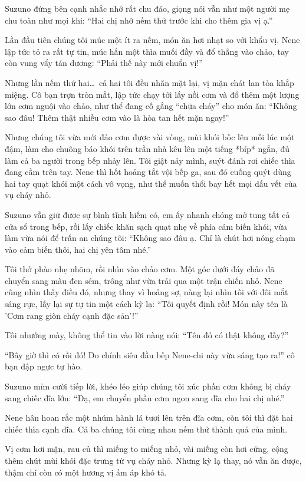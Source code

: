 \documentclass[../main.tex]{subfiles}
\begin{document}
Suzuno đứng bên cạnh nhắc nhở rất chu đáo, giọng nói vẫn như một người mẹ chu toàn như mọi khi: ``Hai chị nhớ nếm thử trước khi cho thêm gia vị ạ.''

Lần đầu tiên chúng tôi múc một ít ra nếm, món ăn hơi nhạt so với khẩu vị. Nene lập tức tỏ ra rất tự tin, múc hẳn một thìa muối đầy và đổ thẳng vào chảo, tay còn vung vẩy tán dương: ``Phải thế này mới chuẩn vị!''

Nhưng lần nếm thứ hai\dots\ cả hai tôi đều nhăn mặt lại, vị mặn chát lan tỏa khắp miệng. Cô bạn trợn tròn mắt, lập tức chạy tới lấy nồi cơm và đổ thêm một lượng lớn cơm nguội vào chảo, như thể đang cố gắng ``chữa cháy'' cho món ăn: ``Không sao đâu! Thêm thật nhiều cơm vào là hòa tan hết mặn ngay!''

Nhưng chúng tôi vừa mới đảo cơm được vài vòng, mùi khói bốc lên mỗi lúc một đậm, làm cho chuông báo khói trên trần nhà kêu lên một tiếng *bíp* ngắn, đủ làm cả ba người trong bếp nhảy lên. Tôi giật nảy mình, suýt đánh rơi chiếc thìa đang cầm trên tay. Nene thì hốt hoảng tắt vội bếp ga, sau đó cuống quýt dùng hai tay quạt khói một cách vô vọng, như thể muốn thổi bay hết mọi dấu vết của vụ cháy nhỏ.

Suzuno vẫn giữ được sự bình tĩnh hiếm có, em ấy nhanh chóng mở tung tất cả cửa sổ trong bếp, rồi lấy chiếc khăn sạch quạt nhẹ về phía cảm biến khói, vừa làm vừa nói để trấn an chúng tôi: ``Không sao đâu ạ. Chỉ là chút hơi nóng chạm vào cảm biến thôi, hai chị yên tâm nhé.''

Tôi thở phào nhẹ nhõm, rồi nhìn vào chảo cơm. Một góc dưới đáy chảo đã chuyển sang màu đen sém, trông như vừa trải qua một trận chiến nhỏ. Nene cũng nhìn thấy điều đó, nhưng thay vì hoảng sợ, nàng lại nhìn tôi với đôi mắt sáng rực, lấy lại sự tự tin một cách kỳ lạ: ``Tôi quyết định rồi! Món này tên là 'Cơm rang giòn cháy cạnh đặc sản'!''

Tôi nhướng mày, không thể tin vào lời nàng nói: ``Tên đó có thật không đấy?''

``Bây giờ thì có rồi đó! Do chính siêu đầu bếp Nene-chi này vừa sáng tạo ra!'' cô bạn đập ngực tự hào.

Suzuno mỉm cười tiếp lời, khéo léo giúp chúng tôi xúc phần cơm không bị cháy sang chiếc đĩa lớn: ``Dạ, em chuyển phần cơm ngon sang đĩa cho hai chị nhé.''

Nene hân hoan rắc một nhúm hành lá tươi lên trên đĩa cơm, còn tôi thì đặt hai chiếc thìa cạnh đĩa. Cả ba chúng tôi cùng nhau nếm thử thành quả của mình.

Vị cơm hơi mặn, rau củ thì miếng to miếng nhỏ, vài miếng còn hơi cứng, cộng thêm chút mùi khói đặc trưng từ vụ cháy nhỏ. Nhưng kỳ lạ thay, nó vẫn ăn được, thậm chí còn có một hương vị ấm áp khó tả.
\end{document}

